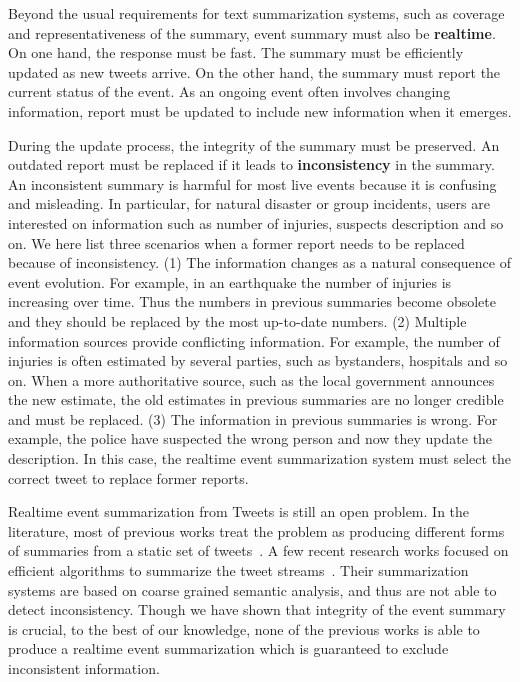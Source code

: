 \documentclass{llncs}
\begin{document}
Beyond the usual requirements for text summarization systems, such as coverage and representativeness of the summary,  event summary must also be \textbf{realtime}. On one hand, the response must be fast. The summary must be efficiently updated as new tweets arrive. On the other hand, the summary must report the current status of the event. As an ongoing event often involves changing information, report must be updated to include new information when it emerges.

During the update process, the integrity of the summary must be preserved.  An outdated report must be replaced if it leads to \textbf{inconsistency} in the summary. An inconsistent summary is harmful for most live events because it is confusing and misleading. In particular, for natural disaster or group incidents,  users are interested on  information such as number of injuries, suspects description and so on. We here list three scenarios when a former report needs to be replaced because of inconsistency. (1) The information changes as a natural consequence of event evolution. For example, in an earthquake the number of injuries is increasing over time. Thus the numbers in previous summaries become obsolete and they should be replaced by the most up-to-date numbers. (2) Multiple information sources provide conflicting information. For example, the number of injuries is often estimated by several parties, such as  bystanders, hospitals and so on. When a more authoritative source, such as the local government announces the new estimate, the old estimates in previous summaries are no longer credible and must be replaced. (3) The information in previous summaries is wrong. For example, the police have suspected the wrong person and now they update the description. In this case, the realtime event summarization system must select the correct tweet to replace former reports.


Realtime event summarization from Tweets is still an open problem. In the literature, most of previous works treat the problem as producing different forms of summaries from a static set of tweets~\cite{Takamura2011Summarizing,Lin2012Generating,Rudra2015Extracting,Liu2016LEDS,Gillani2017Post}. A few recent research works focused on efficient algorithms to summarize the tweet streams~\cite{Shou2013Sumblr,Zubiaga2012Towards}. Their summarization systems are based on coarse grained semantic analysis, and thus are not able to detect inconsistency. Though we have shown that integrity of the event summary is crucial, to the best of our knowledge, none of the previous works is able to produce a realtime event summarization which is guaranteed to exclude inconsistent information.
\end{document}
